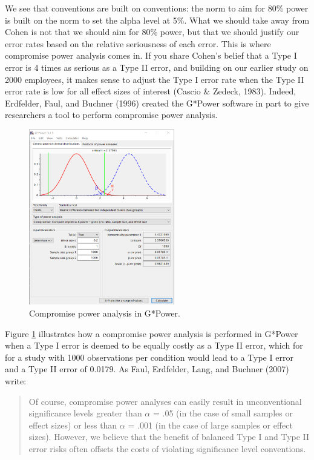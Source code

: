 \documentclass[
  english,
  ,jou, a4paper,floatsintext]{apa6}
\begin{document}
We see that conventions are built on conventions: the norm to aim for 80\% power is built on the norm to set the alpha level at 5\%. What we should take away from Cohen is not that we should aim for 80\% power, but that we should justify our error rates based on the relative seriousness of each error. This is where compromise power analysis comes in. If you share Cohen's belief that a Type I error is 4 times as serious as a Type II error, and building on our earlier study on 2000 employees, it makes sense to adjust the Type I error rate when the Type II error rate is low for all effect sizes of interest (Cascio \& Zedeck, 1983). Indeed, Erdfelder, Faul, and Buchner (1996) created the G*Power software in part to give researchers a tool to perform compromise power analysis.

\begin{figure}
\includegraphics[width=240px]{images/compromise1} \caption{Compromise power analysis in G*Power.}\label{fig:gpowcompromise}
\end{figure}

Figure \ref{fig:gpowcompromise} illustrates how a compromise power analysis is performed in G*Power when a Type I error is deemed to be equally costly as a Type II error, which for for a study with 1000 observations per condition would lead to a Type I error and a Type II error of 0.0179. As Faul, Erdfelder, Lang, and Buchner (2007) write:

\begin{quote}
Of course, compromise power analyses can easily result in unconventional significance levels greater than \(\alpha\) = .05 (in the case of small samples or effect sizes) or less than \(\alpha\) = .001 (in the case of large samples or effect sizes). However, we believe that the benefit of balanced Type I and Type II error risks often offsets the costs of violating significance level conventions.
\end{quote}
\end{document}
